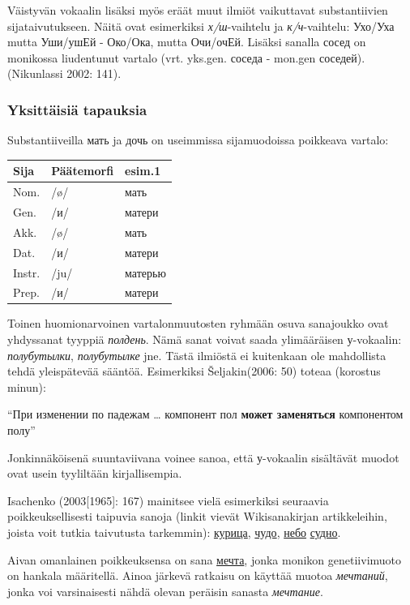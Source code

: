 \documentclass[]{scrreprt}
\begin{document}
Väistyvän vokaalin lisäksi myös eräät muut ilmiöt vaikuttavat
substantiivien sijataivutukseen. Näitä ovat esimerkiksi
\emph{х/ш}-vaihtelu ja \emph{к/ч}-vaihtelu: Ухо/Уха mutta Уши/ушЕй -
Око/Ока, mutta Очи/очЕй. Lisäksi sanalla сосед on monikossa liudentunut
vartalo (vrt. yks.gen. соседа - mon.gen соседей). (Nikunlassi 2002:
141).

\subsubsection{Yksittäisiä tapauksia}\label{yksittuxe4isiuxe4-tapauksia}

Substantiiveilla мать ja дочь on useimmissa sijamuodoissa poikkeava
vartalo:

\begin{longtable}[c]{@{}lll@{}}
\toprule
Sija & Päätemorfi & esim.1\tabularnewline
\midrule
\endhead
Nom. & /ø/ & мать\tabularnewline
Gen. & /и/ & матери\tabularnewline
Akk. & /ø/ & мать\tabularnewline
Dat. & /и/ & матери\tabularnewline
Instr. & /ju/ & матерью\tabularnewline
Prep. & /и/ & матери\tabularnewline
\bottomrule
\end{longtable}

Toinen huomionarvoinen vartalonmuutosten ryhmään osuva sanajoukko ovat
yhdyssanat tyyppiä \emph{полдень}. Nämä sanat voivat saada ylimääräisen
у-vokaalin: \emph{полубутылки}, \emph{полубутылке} jne. Tästä ilmiöstä
ei kuitenkaan ole mahdollista tehdä yleispätevää sääntöä. Esimerkiksi
Šeljakin(2006: 50) toteaa (korostus minun):

``При изменении по падежам \ldots{} компонент пол \textbf{может
заменяться} компонентом полу''

Jonkinnäköisenä suuntaviivana voinee sanoa, että у-vokaalin sisältävät
muodot ovat usein tyyliltään kirjallisempia.

Isachenko (2003{[}1965{]}: 167) mainitsee vielä esimerkiksi seuraavia
poikkeuksellisesti taipuvia sanoja (linkit vievät Wikisanakirjan
artikkeleihin, joista voit tutkia taivutusta tarkemmin):
\href{https://ru.wiktionary.org/wiki/\%D0\%BA\%D1\%83\%D1\%80\%D0\%B8\%D1\%86\%D0\%B0}{курица},
\href{https://ru.wiktionary.org/wiki/\%D1\%87\%D1\%83\%D0\%B4\%D0\%BE}{чудо},
\href{https://ru.wiktionary.org/wiki/\%D0\%BD\%D0\%B5\%D0\%B1\%D0\%BE}{небо}
\href{https://ru.wiktionary.org/wiki/\%D1\%81\%D1\%83\%D0\%B4\%D0\%BD\%D0\%BE}{судно}.

Aivan omanlainen poikkeuksensa on sana
\href{https://ru.wiktionary.org/wiki/\%D0\%BC\%D0\%B5\%D1\%87\%D1\%82\%D0\%B0}{мечта},
jonka monikon genetiivimuoto on hankala määritellä. Ainoa järkevä
ratkaisu on käyttää muotoa \emph{мечтаний}, jonka voi varsinaisesti
nähdä olevan peräisin sanasta \emph{мечтание}.
\end{document}
